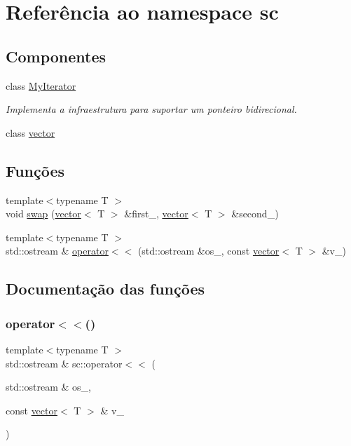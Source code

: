 \hypertarget{namespacesc}{}\section{Referência ao namespace sc}
\label{namespacesc}
\subsection*{Componentes}
\begin{DoxyCompactItemize}
\item 
class \hyperlink{classsc_1_1MyIterator}{My\+Iterator}
\begin{DoxyCompactList}\small\item\em Implementa a infraestrutura para suportar um ponteiro bidirecional. \end{DoxyCompactList}\item 
class \hyperlink{classsc_1_1vector}{vector}
\end{DoxyCompactItemize}
\subsection*{Funções}
\begin{DoxyCompactItemize}
\item 
{\footnotesize template$<$typename T $>$ }\\void \hyperlink{namespacesc_ac8c8a40b2448b8d340e7d5019dc6fc70}{swap} (\hyperlink{classsc_1_1vector}{vector}$<$ T $>$ \&first\+\_\+, \hyperlink{classsc_1_1vector}{vector}$<$ T $>$ \&second\+\_\+)
\item 
{\footnotesize template$<$typename T $>$ }\\std\+::ostream \& \hyperlink{namespacesc_a3817d7e14aea07badea7976d5c4784fa}{operator$<$$<$} (std\+::ostream \&os\+\_\+, const \hyperlink{classsc_1_1vector}{vector}$<$ T $>$ \&v\+\_\+)
\end{DoxyCompactItemize}


\subsection{Documentação das funções}
\mbox{\label{namespacesc_a3817d7e14aea07badea7976d5c4784fa}} 
\subsubsection{\texorpdfstring{operator$<$$<$()}{operator<<()}}
{\footnotesize\ttfamily template$<$typename T $>$ \\
std\+::ostream \& sc\+::operator$<$$<$ (\begin{DoxyParamCaption}\item[{std\+::ostream \&}]{os\+\_\+,  }\item[{const \hyperlink{classsc_1_1vector}{vector}$<$ T $>$ \&}]{v\+\_\+ }\end{DoxyParamCaption})}

